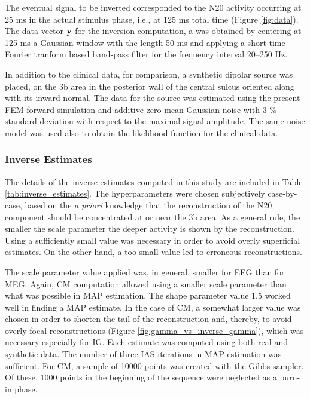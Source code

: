 \documentclass[5p]{elsarticle}
\begin{document}
The eventual signal to be inverted corresponded to the N20 activity occurring at 25 ms in the actual stimulus phase, i.e., at 125 ms total time (Figure \ref{fig:data}). The data vector ${\bf y}$ for the inversion computation, a was obtained by centering at 125 ms a Gaussian window with the length 50 ms and applying a short-time Fourier tranform based  band-pass filter for the frequency interval 20--250 Hz.

In addition to the clinical data, for comparison, a synthetic dipolar source was placed, on the 3b area in the posterior wall of the central sulcus oriented along with its inward normal. The data for the source was estimated using the present FEM forward simulation and additive zero mean Gaussian noise with 3 \% standard deviation with respect to the maximal signal amplitude. The same noise model was used also to obtain the likelihood function for the clinical data.   

\subsubsection{Inverse Estimates}

The details of the inverse estimates computed in this study are included in Table \ref{tab:inverse_estimates}. The hyperparameters were chosen subjectively case-by-case, based on the {\em a priori} knowledge that the reconstruction of the N20 component should be concentrated at or near the 3b area. 
As a general rule, the smaller the scale parameter the deeper activity is shown by the reconstruction. Using a sufficiently small value was necessary in order to avoid overly superficial estimates. On the other hand, a too small value led to  erroneous reconstructions. 

The scale parameter value applied was, in general, smaller for EEG than for MEG. Again, CM computation allowed using a smaller scale parameter than what was possible in MAP estimation. The shape parameter value 1.5 worked well in finding a MAP estimate. In the case of CM, a somewhat larger value was chosen in order to shorten the tail of the reconstruction and, thereby, to avoid overly focal reconstructions (Figure \ref{fig:gamma_vs_inverse_gamma}), which was necessary especially for IG. Each estimate was computed using both real and synthetic data. The number of three IAS iterations in MAP estimation was sufficient. For CM, a sample of 10000 points was created with the Gibbs sampler. Of these, 1000 points in the beginning of the sequence were neglected as a burn-in phase. 
\end{document}
